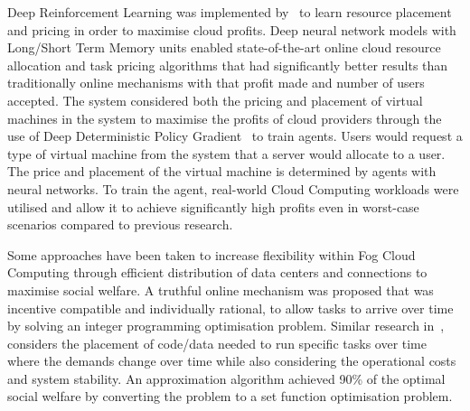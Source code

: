Deep Reinforcement Learning was implemented by~\cite{Du2019} to learn resource placement and pricing in order to
maximise cloud profits. Deep neural network models with Long/Short Term Memory units enabled state-of-the-art online
cloud resource allocation and task pricing algorithms that had significantly better results than traditionally
online mechanisms with that profit made and number of users accepted. The system considered both the pricing and
placement of virtual machines in the system to maximise the profits of cloud providers through the use of Deep
Deterministic Policy Gradient~\citep{ddpg} to train agents. Users would request a type of virtual machine from the
system that a server would allocate to a user. The price and placement of the virtual machine is determined by
agents with neural networks. To train the agent, real-world Cloud Computing workloads were utilised and allow it to
achieve significantly high profits even in worst-case scenarios compared to previous research.

Some approaches have been taken to increase flexibility within Fog Cloud Computing \citep{Bi2019} through efficient
distribution of data centers and connections to maximise social welfare. A truthful online mechanism was
proposed that was incentive compatible and individually rational, to allow tasks to arrive over time by solving an
integer programming optimisation problem. Similar research in~\cite{vaji_infocom}, considers the placement of code/data
needed to run specific tasks over time where the demands change over time while also considering the operational costs
and system stability. An approximation algorithm achieved 90\% of the optimal social welfare by converting the problem
to a set function optimisation problem.


